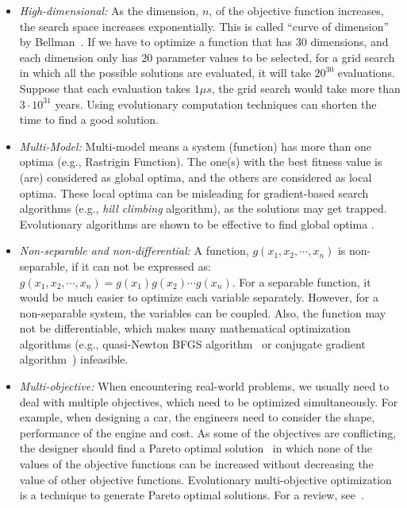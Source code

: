 \begin{itemize}

\item \textit{High-dimensional:} As the dimension, $n$, of the objective function increases, the search space increases exponentially. This is called ``curve of dimension'' by Bellman~\cite{Bellman1957}. If we have to optimize a function that has $30$ dimensions, and each dimension only has $20$ parameter values to be selected, for a grid search in which all the possible solutions are evaluated, it will take $20^{30}$ evaluations. Suppose that each evaluation takes $1\mu s$, the grid search would take more than $3\cdot 10^{31}$ years. Using evolutionary computation techniques can shorten the time to find a good solution. 

\item \textit{Multi-Model:} Multi-model means a system (function) has more than one optima (e.g., Rastrigin Function). The one(s) with the best fitness value is (are) considered as global optima, and the others are considered as local optima. These local optima can be misleading for gradient-based search algorithms (e.g., \textit{hill climbing} algorithm), as the solutions may get trapped. Evolutionary algorithms are shown to be effective to find global optima \cite{Hansen2003}. %

\item \textit{Non-separable and non-differential:} A function, $g(x_1, x_2, \cdots, x_n)$ is non-separable, if it can not be expressed as: $g(x_1, x_2, \cdots, x_n) = g(x_1)g(x_2) \cdots g(x_n)$. For a separable function, it would be much easier to optimize each variable separately. However, for a non-separable system, the variables can be coupled. Also, the function may not be differentiable, which makes many mathematical optimization algorithms (e.g., quasi-Newton BFGS algorithm~\cite{Dennis1977} or conjugate gradient algorithm~\cite{Shewchuk1994}) infeasible. %

\item \textit{Multi-objective:} When encountering real-world problems, we usually need to deal with multiple objectives, which need to be optimized simultaneously. For example, when designing a car, the engineers need to consider the shape, performance of the engine and cost. As some of the objectives are conflicting, the designer should find a Pareto optimal solution~\cite{Fonseca1995} in which none of the values of the objective functions can be increased without decreasing the value of other objective functions. Evolutionary multi-objective optimization is a technique to generate Pareto optimal solutions. For a review, see~\cite{Fonseca1995}. 

\end{itemize}

